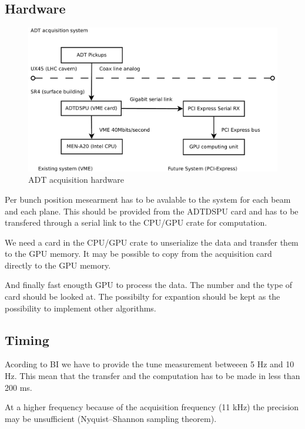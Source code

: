    \subsection{Hardware}

   \begin{figure}[H]
	\caption{ADT acquisition hardware}
	\centering
	\includegraphics[scale=0.3]{acquisition.pdf}
	\end{figure}

   Per bunch position mesearment has to be avalable to the system for each beam and each plane. This should be provided from the ADTDSPU card and has to be transfered through a serial link to the CPU/GPU crate for computation.

   We need a card in the CPU/GPU crate to unserialize the data and transfer them to the GPU memory. It may be possible to copy from the acquisition card directly to the GPU memory.

   And finally fast enougth GPU to process the data. The number and the type of card should be looked at. The possibilty for expantion should be kept as the possibility to implement other algorithms.
   
   \subsection{Timing}

   Acording to \gls{BI} we have to provide the tune measurement betweeen 5 Hz and 10 Hz. This mean that the transfer and the computation has to be made in less than 200 ms.

   At a higher frequency because of the acquisition frequency (11 kHz) the precision may be unsufficient (Nyquist–Shannon sampling theorem).